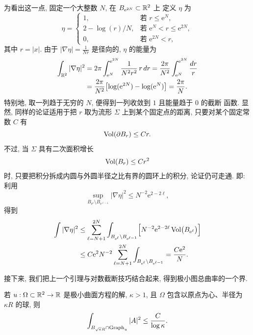 为看出这一点, 固定一个大整数 $N$, 在 $B_{\mathrm{e}^{2N}}\subset\mathbb{R}^2$ 上
定义 $\eta$ 为
\begin{equation}
\eta=
\begin{cases}
1, & \text{若 } r\leq\mathrm{e}^{N},\\
2-\log(r)/N, & \text{若 } \mathrm{e}^{N}<r\leq\mathrm{e}^{2N},\\
0, & \text{若 } \mathrm{e}^{2N}<r,
\end{cases}
\label{eq:1.101}
\end{equation}
其中 $r=|x|$. 由于 $|\nabla\eta|=\frac{1}{Nr}$ 是径向的, $\eta$ 的能量为
\begin{equation}
\begin{aligned}
\int_{\mathbb{R}^2}|\nabla\eta|^{2}
&=2\pi\int_{\mathrm{e}^{N}}^{\mathrm{e}^{2N}}\frac{1}{N^{2}r^{2}}\,r\,dr
 =\frac{2\pi}{N^{2}}\int_{\mathrm{e}^{N}}^{\mathrm{e}^{2N}}\frac{dr}{r}\\
&=\frac{2\pi}{N^{2}}\bigl[\log(\mathrm{e}^{2N})-\log(\mathrm{e}^{N})\bigr]
 =\frac{2\pi}{N}.
\end{aligned}
\label{eq:1.102}
\end{equation}
特别地, 取一列趋于无穷的 $N$, 便得到一列收敛到 $1$ 且能量趋于 $0$ 的截断
函数. 显然, 同样的论证适用于把 $r$ 取为流形 $\Sigma$ 上到某个固定点的距离,
只要对某个固定常数 $C$ 有
\[
\operatorname{Vol}(\partial B_r)\leq Cr.
\]
不过, 当 $\Sigma$ 具有二次面积增长
\[
\operatorname{Vol}(B_r)\leq Cr^{2}
\]
时, 只要把积分拆成内圆与外圆半径之比有界的圆环上的积分, 论证仍可走通. 即:
利用
\[
\sup_{B_{\mathrm{e}^{\ell}}\setminus B_{\mathrm{e}^{\ell-1}}}
|\nabla\eta|^{2}\leq N^{-2}\mathrm{e}^{2-2\ell},
\]
得到
\begin{equation}
\begin{aligned}
\int|\nabla\eta|^{2}
&\leq\sum_{\ell=N+1}^{2N}
 \int_{B_{\mathrm{e}^{\ell}}\setminus B_{\mathrm{e}^{\ell-1}}}
 \Bigl[N^{-2}\mathrm{e}^{2-2\ell}\operatorname{Vol}\bigl(B_{\mathrm{e}^{\ell}}\bigr)\Bigr]\\
&\leq C\mathrm{e}^{2}N^{-2}\sum_{\ell=N+1}^{2N}
 \int_{B_{\mathrm{e}^{\ell}}\setminus B_{\mathrm{e}^{\ell-1}}}
 =\frac{C\mathrm{e}^{2}}{N}.
\end{aligned}
\label{eq:1.103}
\end{equation}

接下来, 我们把上一个引理与对数截断技巧结合起来, 得到极小图总曲率的一个界.

\begin{corollary}
\label{cor:1.20}
若 $u:\Omega\subset\mathbb{R}^2\to\mathbb{R}$ 是极小曲面方程的解, $\kappa>1$, 且 $\Omega$
包含以原点为心、半径为 $\kappa R$ 的球, 则
\begin{equation}
\int_{B_{\sqrt{\kappa}R}\cap\operatorname{Graph}_u}|A|^{2}
 \leq\frac{C}{\log\kappa}.
\label{eq:1.104}
\end{equation}
\end{corollary}


